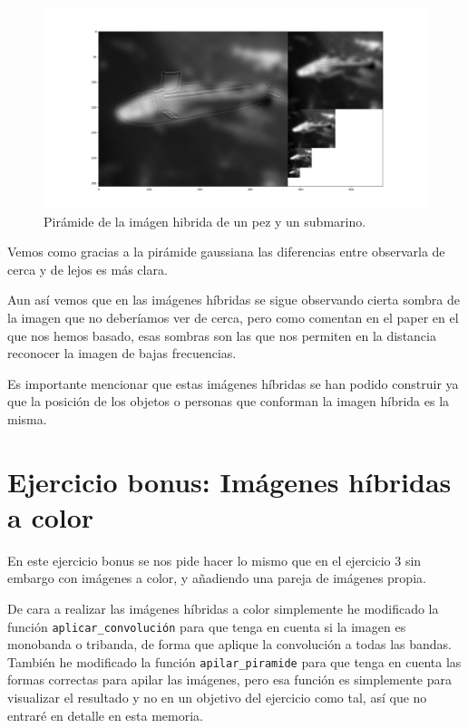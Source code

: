 \documentclass[12pt, spanish]{article}
\begin{document}
\begin{figure}[H]
  \centering
      \includegraphics[width=\textwidth]{hibridas/PP-S.png}
 		 \caption{Pirámide de la imágen hibrida de un pez y un submarino.}
  		\label{fig:ej2al}

\end{figure}

Vemos como gracias a la pirámide gaussiana las diferencias entre observarla de cerca y de lejos es más clara.

Aun así vemos que en las imágenes híbridas se sigue observando cierta sombra de la imagen que no deberíamos ver de cerca, pero como comentan en el paper en el que nos hemos basado, esas sombras son las que nos permiten en la distancia reconocer la imagen de bajas frecuencias.

Es importante mencionar que estas imágenes híbridas se han podido construir ya que la posición de los objetos o personas que conforman la imagen híbrida es la misma.


\newpage

\section{Ejercicio bonus: Imágenes híbridas a color}

En este ejercicio bonus se nos pide hacer lo mismo que en el ejercicio 3 sin embargo con imágenes a color, y añadiendo una pareja de imágenes propia.

De cara a realizar las imágenes híbridas a color simplemente he modificado la función \texttt{aplicar\_convolución} para que tenga en cuenta si la imagen es monobanda o tribanda, de forma que aplique la convolución a todas las bandas. También he modificado la función \texttt{apilar\_piramide} para que tenga en cuenta las formas correctas para apilar las imágenes, pero esa función es simplemente para visualizar el resultado y no en un objetivo del ejercicio como tal, así que no entraré en detalle en esta memoria.
\end{document}
